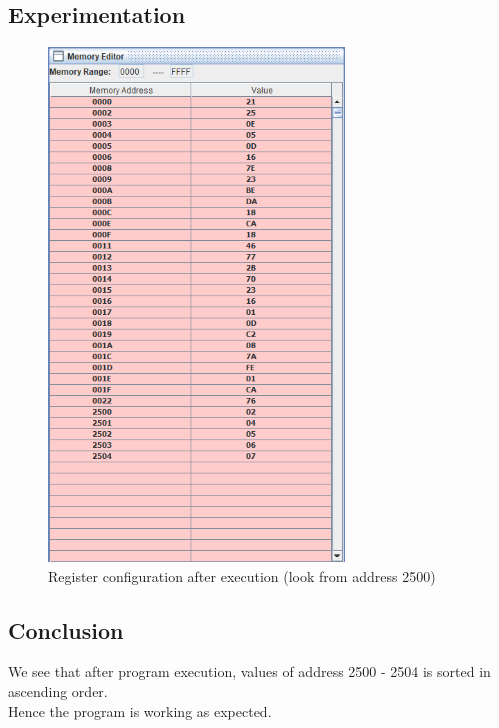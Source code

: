 \documentclass[a4paper]{article} %
\begin{document}
    \subsection{Experimentation}
        \begin{figure}[h!]
            \centering
            \includegraphics[width=0.7\textwidth]{Assignment 3/2_sort/mem_output.png}
            \caption{Register configuration after execution (look from address 2500)}
            \label{fg7}
        \end{figure}
    \subsection{Conclusion}
        We see that after program execution, values of address 2500 - 2504 is sorted in ascending order.\\
        Hence the program is working as expected.
\newpage
\end{document}
